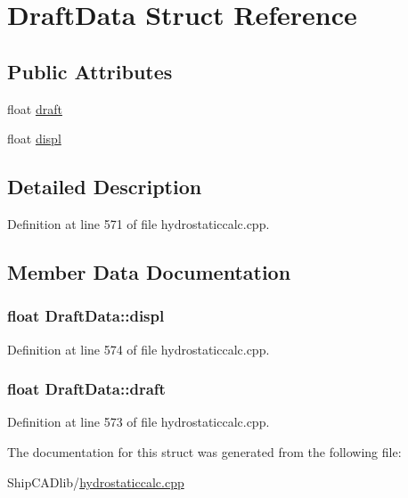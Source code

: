 \hypertarget{structDraftData}{\section{Draft\-Data Struct Reference}
\label{structDraftData}
}
\subsection*{Public Attributes}
\begin{DoxyCompactItemize}
\item 
float \hyperlink{structDraftData_a3f20aeee5cac97b57e9fc5c5315f3ad1}{draft}
\item 
float \hyperlink{structDraftData_ad911e175c740aa5e4e1bba6f5db3b448}{displ}
\end{DoxyCompactItemize}


\subsection{Detailed Description}


Definition at line 571 of file hydrostaticcalc.\-cpp.



\subsection{Member Data Documentation}
\hypertarget{structDraftData_ad911e175c740aa5e4e1bba6f5db3b448}{
\subsubsection[{displ}]{\setlength{\rightskip}{0pt plus 5cm}float Draft\-Data\-::displ}}\label{structDraftData_ad911e175c740aa5e4e1bba6f5db3b448}


Definition at line 574 of file hydrostaticcalc.\-cpp.

\hypertarget{structDraftData_a3f20aeee5cac97b57e9fc5c5315f3ad1}{
\subsubsection[{draft}]{\setlength{\rightskip}{0pt plus 5cm}float Draft\-Data\-::draft}}\label{structDraftData_a3f20aeee5cac97b57e9fc5c5315f3ad1}


Definition at line 573 of file hydrostaticcalc.\-cpp.



The documentation for this struct was generated from the following file\-:\begin{DoxyCompactItemize}
\item 
Ship\-C\-A\-Dlib/\hyperlink{hydrostaticcalc_8cpp}{hydrostaticcalc.\-cpp}\end{DoxyCompactItemize}
